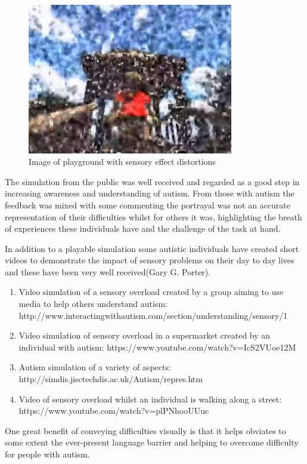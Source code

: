 \documentclass[11pt]{report}
\begin{document}
\begin{figure}[H]
\centering
\includegraphics[width=90mm]{images/litreview/autisim2.png}
\caption{Image of playground with sensory effect distortions}
\label{autisim2}
\end{figure}


The simulation from the public was well received and regarded as a good step in increasing awareness and understanding of autism. From those with autism the feedback was mixed with some commenting the portrayal was not an accurate representation of their difficulties whilst for others it was, highlighting the breath of experiences these individuals have and the challenge of the task at hand.

In addition to a playable simulation some autistic individuals have created short videos to demonstrate the impact of sensory problems on their day to day lives and these have been very well received(Gary G. Porter). 
\begin{enumerate}
\item Video simulation of a sensory overload created by a group aiming to use media to help others understand autism: http://www.interactingwithautism.com/section/understanding/sensory/1
\item Video simulation of sensory overload in a supermarket created by an individual with autism: https://www.youtube.com/watch?v=IcS2VUoe12M
\item Autism simulation of a variety of aspects: http://simdis.jisctechdis.ac.uk/Autism/repres.htm
\item Video of sensory overload whilst an individual is walking along a street: https://www.youtube.com/watch?v=plPNhooUUuc
\end{enumerate}

One great benefit of conveying difficulties visually is that it helps obviates to some extent the ever-present language barrier and helping to overcome difficulty for people with autism.  
\end{document}
